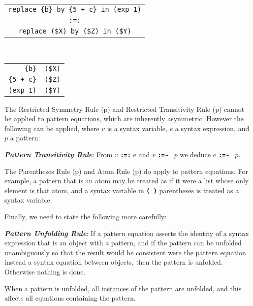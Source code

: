 \documentclass[12pt]{article}
\newcommand{\TT}[1]{{\tt \bfseries #1}}
\newcommand{\ikey}[2]{{\bf \em #1}\index{#2}}
\newcommand{\pagref}[1]{p\pageref{#1}}
\newenvironment{indpar}[1][0.3in]%
	{\begin{list}{}%
		     {\setlength{\itemsep}{0in}%
		      \setlength{\topsep}{0in}%
		      \setlength{\parsep}{1ex}%
		      \setlength{\labelwidth}{#1}%
		      \setlength{\leftmargin}{#1}%
		      \addtolength{\leftmargin}{\labelsep}}%
	 \item}%
	{\end{list}}
\begin{document}
\begin{center}
\begin{tabular}{c}
\verb/replace {b} by {5 + c} in (exp 1)/ \\
\verb/:=:/ \\
\verb/replace ($X) by ($Z) in ($Y)/ \\
\end{tabular} \\[2ex]
\begin{tabular}{r@\TT{~:=:~}l}
\verb/{b}/ & \verb/($X)/ \\
\verb/{5 + c}/ & \verb/($Z)/ \\
\verb/(exp 1)/ & \verb/($Y)/ \\
\end{tabular}
\end{center}

The Restricted Symmetry Rule (\pagref{RESTRICTED-SYMMETRY-RULE})
and Restricted Transitivity Rule (\pagref{RESTRICTED-TRANSITIVITY-RULE})
cannot be applied to pattern equations, which are inherently asymmetric.
However the following can be applied, where $v$ is a syntax variable, $e$
a syntax expression, and $p$ a pattern:

\begin{indpar}
\begin{list}{}{}
\item [\ikey{Pattern Transitivity Rule}{pattern transitivity rule}:]%
\label{PATTERN-TRANSITIVITY-RULE}
From $v$ \TT{:=:} $e$ and $v$ \TT{:=\~~} $p$
we deduce $e$ \TT{:=\~~} $p$.
\end{list}
\end{indpar}

The Parentheses Rule (\pagref{PARENTHESES-RULE})
and Atom Rule (\pagref{ATOM-RULE}) do apply to pattern equations.
For example, a pattern that is an atom may be treated as if it were
a list whose only element is that atom, and a syntax variable in
\TT{( )} parentheses is treated as a syntax variable.

Finally, we need to state the following more carefully:

\begin{indpar}
\begin{list}{}{}
\item [\ikey{Pattern Unfolding Rule}{pattern unfolding rule}:]%
\label{PATTERN-UNFOLDING-RULE}
If a pattern equation asserts the identity of a syntax expression that
is an object with a pattern, and if the pattern can be unfolded unambiguously
so that the result would be consistent were the pattern equation
instead a syntax equation between
objects, then the pattern is unfolded.  Otherwise nothing is done.

When a pattern is unfolded, \underline{all instances} of the pattern
are unfolded, and this affects all equations containing the pattern.
\end{list}
\end{indpar}
\end{document}
